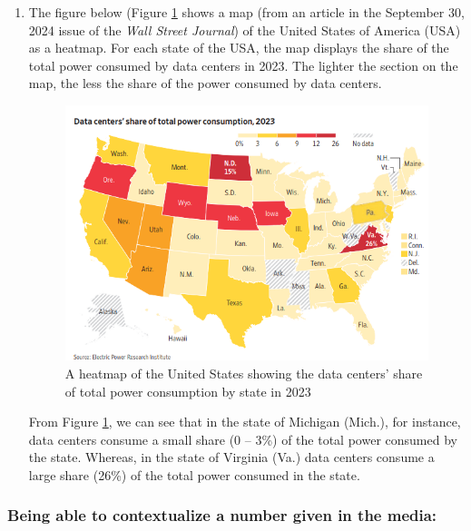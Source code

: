 \documentclass[
]{book}
\begin{document}
\begin{enumerate}
\def\labelenumi{\arabic{enumi}.}
\setcounter{enumi}{1}
\item
  The figure below (Figure \ref{fig2} shows a map (from an article in the September 30, 2024 issue of the \emph{Wall Street Journal}) of the United States of America (USA) as a heatmap. For each state of the USA, the map displays the share of the total power consumed by data centers in 2023. The lighter the section on the map, the less the share of the power consumed by data centers.

  \begin{figure}
  \centering
  \includegraphics[width=5.20833in,height=\textheight]{images/Data_Centers.png}
  \caption{A heatmap of the United States showing the data centers' share of total power consumption by state in 2023}\label{fig2}
  \end{figure}

  From Figure \ref{fig2}, we can see that in the state of Michigan (Mich.), for instance, data centers consume a small share (0 -- 3\%) of the total power consumed by the state. Whereas, in the state of Virginia (Va.) data centers consume a large share (26\%) of the total power consumed in the state.
\end{enumerate}

\subsubsection{Being able to contextualize a number given in the media:}\label{being-able-to-contextualize-a-number-given-in-the-media}
\end{document}
